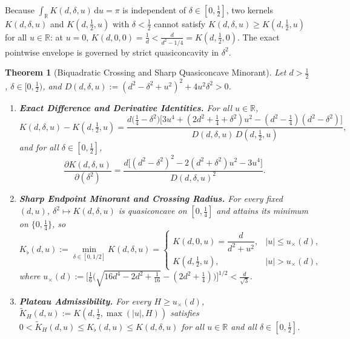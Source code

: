 \documentclass[11pt,reqno]{amsart}
\newtheorem{theorem}{Theorem}[section]
\theoremstyle{definition}
\theoremstyle{remark}
\numberwithin{equation}{section}
\newcommand{\R}{\mathbb{R}}
\newcommand{\dd}{\mathrm{d}}
\begin{document}
Because $\int_{\R} K(d, \delta, u)\,\dd u = \pi$ is independent of $\delta \in [0, \frac{1}{2}]$, two kernels $K(d, \delta, u)$ and $K(d, \frac{1}{2}, u)$ with $\delta < \frac{1}{2}$ cannot satisfy $K(d, \delta, u) \ge K(d, \frac{1}{2}, u)$ for all $u \in \R$: at $u = 0$, $K(d, 0, 0) = \frac{1}{d} < \frac{d}{d^2 - 1/4} = K(d, \frac{1}{2}, 0)$. The exact pointwise envelope is governed by strict quasiconcavity in $\delta^2$.

\begin{theorem}[Biquadratic Crossing and Sharp Quasiconcave Minorant]\label{thm:quasiconcave_crossing}
Let $d > \frac{1}{2}$, $\delta \in [0, \frac{1}{2})$, and $D(d, \delta, u) := (d^2 - \delta^2 + u^2)^2 + 4u^2\delta^2 > 0$.
\begin{enumerate}[label=\textup{(\roman*)},leftmargin=2.2em]
\item \textbf{Exact Difference and Derivative Identities.} For all $u \in \R$,
\begin{equation}\label{eq:K_diff_biquadratic}
K(d, \delta, u) - K\!\left(d, \tfrac{1}{2}, u\right) = \frac{d\bigl(\frac{1}{4} - \delta^2\bigr)\bigl[3u^4 + (2d^2 + \frac{1}{4} + \delta^2)u^2 - (d^2 - \frac{1}{4})(d^2 - \delta^2)\bigr]}{D(d, \delta, u)\,D(d, \frac{1}{2}, u)},
\end{equation}
and for all $\delta \in [0, \frac{1}{2}]$,
\begin{equation}\label{eq:dK_ddelta2}
\frac{\partial K(d, \delta, u)}{\partial(\delta^2)} = \frac{d\bigl[(d^2 - \delta^2)^2 - 2(d^2 + \delta^2)u^2 - 3u^4\bigr]}{D(d, \delta, u)^2}.
\end{equation}
\item \textbf{Sharp Endpoint Minorant and Crossing Radius.} For every fixed $(d, u)$, $\delta^2 \mapsto K(d, \delta, u)$ is quasiconcave on $[0, \frac{1}{4}]$ and attains its minimum on $\{0, \frac{1}{4}\}$, so
\begin{equation}\label{eq:u_cross_exact}
K_{\flat}(d, u) := \min_{\delta \in [0, 1/2]} K(d, \delta, u) = \begin{cases} K(d, 0, u) = \dfrac{d}{d^2 + u^2}, & \lvert u\rvert \le u_{\times}(d), \\[8pt] K(d, \tfrac{1}{2}, u), & \lvert u\rvert > u_{\times}(d), \end{cases}
\end{equation}
where $u_{\times}(d) := \bigl[\frac{1}{6}\bigl(\sqrt{16d^4 - 2d^2 + \frac{1}{16}} - (2d^2 + \frac{1}{4})\bigr)\bigr]^{1/2} < \frac{d}{\sqrt{3}}$.
\item \textbf{Plateau Admissibility.} For every $H \ge u_{\times}(d)$, $\widetilde{K}_H(d, u) := K(d, \frac{1}{2}, \max(\lvert u\rvert, H))$ satisfies $0 < \widetilde{K}_H(d, u) \le K_{\flat}(d, u) \le K(d, \delta, u)$ for all $u \in \R$ and all $\delta \in [0, \frac{1}{2}]$.
\end{enumerate}
\end{theorem}
\end{document}
